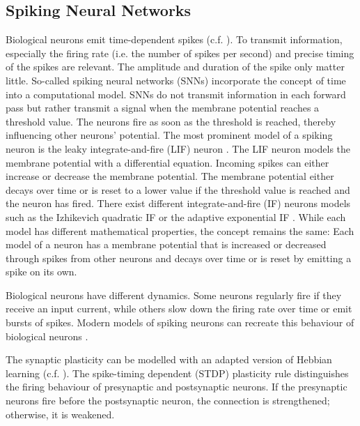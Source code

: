 \subsection{Spiking Neural Networks}
Biological neurons emit time-dependent spikes (c.f. ).
To transmit information, especially the firing rate (i.e. the number of spikes per second) and precise timing of the spikes are relevant.
The amplitude and duration of the spike only matter little.
So-called spiking neural networks (SNNs) incorporate the concept of time into a computational model.
SNNs do not transmit information in each forward pass but rather transmit a signal when the membrane potential reaches a threshold value. 
The neurons fire as soon as the threshold is reached, thereby influencing other neurons' potential.
The most prominent model of a spiking neuron is the leaky integrate-and-fire (LIF) neuron .
The LIF neuron models the membrane potential with a differential equation.
Incoming spikes can either increase or decrease the membrane potential.
The membrane potential either decays over time or is reset to a lower value if the threshold value is reached and the neuron has fired.
There exist different integrate-and-fire (IF) neurons models such as the Izhikevich quadratic IF  or the adaptive exponential IF .
While each model has different mathematical properties, the concept remains the same: Each model of a neuron has a membrane potential that is increased or decreased through spikes from other neurons and decays over time or is reset by emitting a spike on its own.

Biological neurons have different dynamics.
Some neurons regularly fire if they receive an input current, while others slow down the firing rate over time or emit bursts of spikes.
Modern models of spiking neurons can recreate this behaviour of biological neurons .

The synaptic plasticity can be modelled with an adapted version of Hebbian learning (c.f. ).
The spike-timing dependent (STDP) plasticity rule  distinguishes the firing behaviour of presynaptic and postsynaptic neurons.
If the presynaptic neurons fire before the postsynaptic neuron, the connection is strengthened; otherwise, it is weakened.

